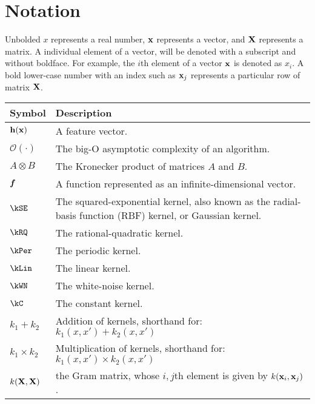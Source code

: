 
\inbpdocument

\chapter*{Notation}
\label{ch:notation}


Unbolded $x$ represents a real number, ${\bf{x}}$ represents a vector, and $\mathbf{X}$ represents a matrix.
A individual element of a vector, will be denoted with a subscript and without boldface.
For example, the $i$th element of a vector ${\bf{x}}$ is denoted as $x_i$.
A bold lower-case number with an index such as ${\bf{x}}_j$ represents a particular row of matrix $\mathbf{X}$.

\vspace{1cm}

\begin{tabular}{lm{12cm}}
Symbol \quad     & Description \\
\hline
${\bf{h}}({\bf{x}})$       & A feature vector. \\
$\mathcal{O}(\cdot)$ & The big-O asymptotic complexity of an algorithm. \\
$A \otimes B$ & The Kronecker product of matrices $A$ and $B$. \\
$\boldsymbol{f}$ & A function represented as an infinite-dimensional vector. \\
$\kSE$ & The squared-exponential kernel, also known as the radial-basis function (RBF) kernel, or Gaussian kernel. \\
$\kRQ$ & The rational-quadratic kernel. \\
$\kPer$ & The periodic kernel. \\
$\kLin$ & The linear kernel. \\
$\kWN$ & The white-noise kernel. \\
$\kC$ & The constant kernel. \\
$k_1 + k_2$ & Addition of kernels, shorthand for: $k_1(x,x') + k_2(x,x')$ \\
$k_1 \times k_2$& Multiplication of kernels, shorthand for: $k_1(x,x') \times k_2(x,x')$ \\
$k(\mathbf{X}, \mathbf{X})$ & the Gram matrix, whose $i,j$th element is given by $k({\bf{x}}_i, {\bf{x}}_j)$.
\end{tabular}

\outbpdocument{
}


